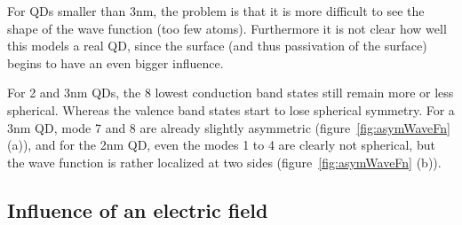 For QDs smaller than 3nm, the problem is that it is more difficult to see the shape of the wave function (too few atoms). Furthermore it is not clear how well this models a real QD, since the surface (and thus passivation of the surface) begins to have an even bigger influence.
	
For 2 and 3nm QDs, the 8 lowest conduction band states still remain more or less spherical. Whereas the valence band states start to lose spherical symmetry. For a 3nm QD, mode 7 and 8 are already slightly asymmetric (figure~\ref{fig:asymWaveFn} (a)), and for the 2nm QD, even the modes 1 to 4 are clearly not spherical, but the wave function is rather localized at two sides (figure~\ref{fig:asymWaveFn} (b)).
	
\FloatBarrier
\subsection{Influence of an electric field}

